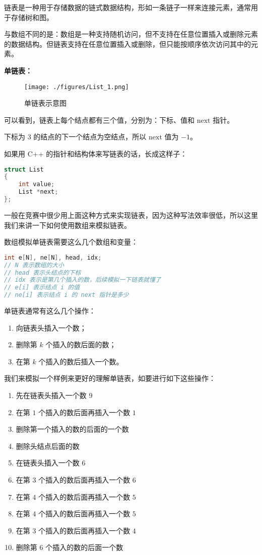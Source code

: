 
链表是一种用于存储数据的链式数据结构，形如一条链子一样来连接元素，通常用于存储树和图。

与数组不同的是：数组是一种支持随机访问，但不支持在任意位置插入或删除元素的数据结构。但链表支持在任意位置插入或删除，但只能按顺序依次访问其中的元素。

\textbf{单链表：}

\begin{figure}[ht]
\centering
\texttt{[image: ./figures/List\_1.png]}
\caption{单链表示意图} \label{List_fig1}
\end{figure}

可以看到，链表上每个结点都有三个值，分别为：下标、值和 $\text{next}$ 指针。

下标为 $3$ 的结点的下一个结点为空结点，所以 $\text{next}$ 值为 $-1$。

如果用 C++ 的指针和结构体来写链表的话，长成这样子：
\begin{lstlisting}[language=cpp]
struct List
{
    int value;
    List *next;
};
\end{lstlisting}

一般在竞赛中很少用上面这种方式来实现链表，因为这种写法效率很低，所以这里我们来讲一下如何使用数组来模拟链表。

数组模拟单链表需要这么几个数组和变量：
\begin{lstlisting}[language=cpp]
int e[N], ne[N], head, idx;
// N 表示数组的大小
// head 表示头结点的下标
// idx 表示是第几个插入的数，后续模拟一下链表就懂了
// e[i] 表示结点 i 的值
// ne[i] 表示结点 i 的 next 指针是多少
\end{lstlisting}

单链表通常有这么几个操作：
\begin{enumerate}
\item 向链表头插入一个数；
\item 删除第 $k$ 个插入的数后面的数；
\item 在第 $k$ 个插入的数后插入一个数。
\end{enumerate}

我们来模拟一个样例来更好的理解单链表，如要进行如下这些操作：

\begin{enumerate}
\item 先在链表头插入一个数 $9$
\item 在第 $1$ 个插入的数后面再插入一个数 $1$
\item 删除第一个插入的数的后面的一个数
\item 删除头结点后面的数
\item 在链表头插入一个数 $6$
\item 在第 $3$ 个插入的数后面再插入一个数 $6$
\item 在第 $4$ 个插入的数后面再插入一个数 $5$
\item 在第 $4$ 个插入的数后面再插入一个数 $5$
\item 在第 $3$ 个插入的数后面再插入一个数 $4$
\item 删除第 $6$ 个插入的数的后面一个数
\end{enumerate}

